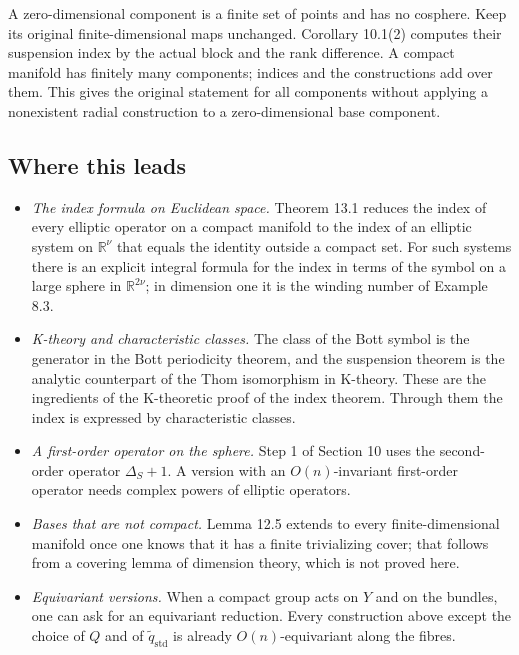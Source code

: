 \documentclass[
  11pt,
]{article}
\providecommand{\tightlist}{%
  \setlength{\itemsep}{0pt}\setlength{\parskip}{0pt}}
\begin{document}
A zero-dimensional component is a finite set of points and has no
cosphere. Keep its original finite-dimensional maps unchanged. Corollary
10.1(2) computes their suspension index by the actual block and the rank
difference. A compact manifold has finitely many components; indices and
the constructions add over them. This gives the original statement for
all components without applying a nonexistent radial construction to a
zero-dimensional base component.

\subsection{Where this leads}\label{where-this-leads}

\begin{itemize}
\tightlist
\item
  \emph{The index formula on Euclidean space.} Theorem 13.1 reduces the
  index of every elliptic operator on a compact manifold to the index of
  an elliptic system on \(\mathbb R^\nu\) that equals the identity
  outside a compact set. For such systems there is an explicit integral
  formula for the index in terms of the symbol on a large sphere in
  \(\mathbb R^{2\nu}\); in dimension one it is the winding number of
  Example 8.3.
\item
  \emph{K-theory and characteristic classes.} The class of the Bott
  symbol is the generator in the Bott periodicity theorem, and the
  suspension theorem is the analytic counterpart of the Thom isomorphism
  in K-theory. These are the ingredients of the K-theoretic proof of the
  index theorem. Through them the index is expressed by characteristic
  classes.
\item
  \emph{A first-order operator on the sphere.} Step 1 of Section 10 uses
  the second-order operator \(\Delta_S+1\). A version with an
  \(O(n)\)-invariant first-order operator needs complex powers of
  elliptic operators.
\item
  \emph{Bases that are not compact.} Lemma 12.5 extends to every
  finite-dimensional manifold once one knows that it has a finite
  trivializing cover; that follows from a covering lemma of dimension
  theory, which is not proved here.
\item
  \emph{Equivariant versions.} When a compact group acts on \(Y\) and on
  the bundles, one can ask for an equivariant reduction. Every
  construction above except the choice of \(Q\) and of
  \(\tilde q_{\mathrm{std}}\) is already \(O(n)\)-equivariant along the
  fibres.
\end{itemize}
\end{document}
